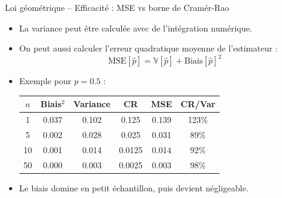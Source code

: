 \documentclass[11pt,aspectratio=169]{beamer}
\begin{document}
\begin{frame}{Loi géométrique -- Efficacité : MSE vs borne de Cramér-Rao}

\begin{itemize}

\item La variance peut être calculée avec de l'intégration numérique.
  
\item On peut aussi calculer l'erreur quadratique moyenne de l'estimateur :
  \[
  \text{MSE}[\hat{p}] = \mathbb{V}[\hat{p}] + \text{Biais}[\hat{p}]^2
  \]

\item Exemple pour $p = 0.5$ :

  \medskip
  
  \begin{center}
    \small
    \begin{tabular}{cccccc}
      \hline
      $n$ & Biais$^2$ & Variance & CR & MSE & CR/Var \\
      \hline
      1 & 0.037 & 0.102 & 0.125 & 0.139 & 123\% \\
      5 & 0.002 & 0.028 & 0.025 & 0.031 & 89\% \\
      10 & 0.001 & 0.014 & 0.0125 & 0.014 & 92\% \\
      50 & 0.000 & 0.003 & 0.0025 & 0.003 & 98\% \\
      \hline
    \end{tabular}
  \end{center}

  \medskip

\item Le biais domine en petit échantillon, puis devient négligeable.

\end{itemize}

\end{frame}
\end{document}
